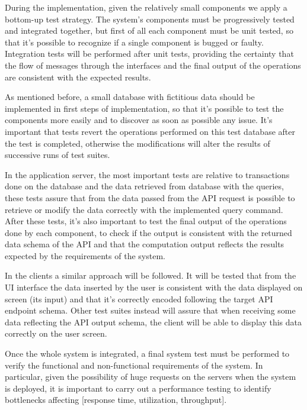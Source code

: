 During the implementation, given the relatively small components we apply a bottom-up test strategy. The system's components must be progressively tested and integrated together, but first of all each component must be unit tested, so that it's possible to recognize if a single component is bugged or faulty. Integration tests will be performed after unit tests, providing the certainty that the flow of messages through the interfaces and the final output of the operations are consistent with the expected results.

As mentioned before, a small database with fictitious data should be implemented in first steps of implementation, so that it's possible to test the components more easily and to discover as soon as possible any issue. It's important that tests revert the operations performed on this test database after the test is completed, otherwise the modifications will alter the results of successive runs of test suites.

In the application server, the most important tests are relative to transactions done on the database and the data retrieved from database with the queries, these tests assure that from the data passed from the API request is possible to retrieve or modify the data correctly with the implemented query command. After these tests, it's also important to test the final output of the operations done by each component, to check if the output is consistent with the returned data schema of the API and that the computation output reflects the results expected by the requirements of the system.

In the clients a similar approach will be followed. It will be tested that from the UI interface the data inserted by the user is consistent with the data displayed on screen (its input) and that it's correctly encoded following the target API endpoint schema. Other test suites instead will assure that when receiving some data reflecting the API output schema, the client will be able to display this data correctly on the user screen. 

Once the whole system is integrated, a final system test must be performed to verify the functional and non-functional requirements of the system. In particular, given the possibility of huge requests on the servers when the system is deployed, it is important to carry out a performance testing to identify bottlenecks affecting [response time, utilization, throughput].